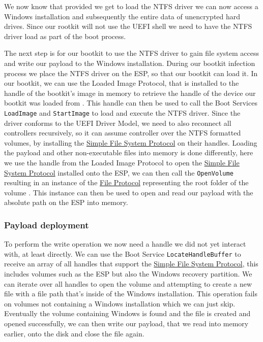 We now know that provided we get to load the \ac{NTFS} driver we can now access a Windows installation and subsequently the entire data of unencrypted hard drives.
Since our rootkit will not use the UEFI shell we need to have the \ac{NTFS} driver load as part of the boot process.

The next step is for our bootkit to use the \ac{NTFS} driver to gain file system access and write our payload to the Windows installation.
During our bootkit infection process we place the \ac{NTFS} driver on the \ac{ESP}, so that our bootkit can load it.
In our bootkit, we can use the Loaded Image Protocol, that is installed to the handle of the bootkit's image in memory to retrieve the handle of the device our bootkit was loaded from \cite[Section 9.1]{uefi-spec}.
This handle can then be used to call the Boot Services \lstinline{LoadImage} and \lstinline{StartImage} to load and execute the NTFS driver.
Since the driver conforms to the UEFI Driver Model, we need to also reconnect all controllers recursively, so it can assume controller over the NTFS formatted volumes, by installing the \hyperref[lst:simple-file-system-protocol]{Simple File System Protocol} on their handles.
Loading the payload and other non-executable files into memory is done differently, here we use the handle from the Loaded Image Protocol to open the \hyperref[lst:simple-file-system-protocol]{Simple File System Protocol} installed onto the \ac{ESP}, we can then call the \lstinline{OpenVolume} resulting in an instance of the \hyperref[lst:simple-file-system-protocol]{File Protocol} representing the root folder of the volume \cite[Section 13.4]{uefi-spec}.
This instance can then be used to open and read our payload with the absolute path on the \ac{ESP} into memory.

\subsubsection{Payload deployment}

To perform the write operation we now need a handle we did not yet interact with, at least directly.
We can use the Boot Service \lstinline{LocateHandleBuffer} to receive an array of all handles that support the \hyperref[lst:simple-file-system-protocol]{Simple File System Protocol}, this includes volumes such as the \ac{ESP} but also the Windows recovery partition.
We can iterate over all handles to open the volume and attempting to create a new file with a file path that's inside of the Windows installation.
This operation fails on volumes not containing a Windows installation which we can just skip.
Eventually the volume containing Windows is found and the file is created and opened successfully, we can then write our payload, that we read into memory earlier, onto the disk and close the file again.

